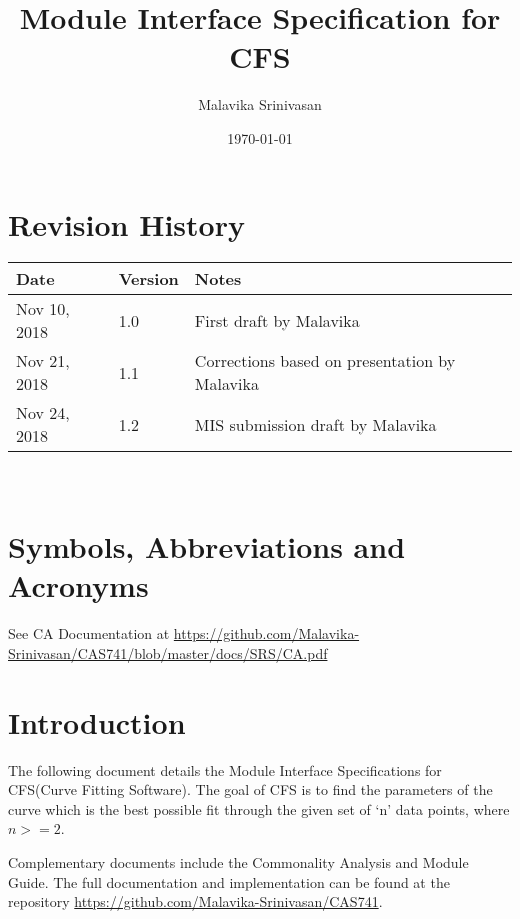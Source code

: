 \documentclass[12pt, titlepage]{article}
\newcommand{\progname}{CFS}
\begin{document}
\title{Module Interface Specification for \progname}

\author{Malavika Srinivasan}

\date{\today}

\maketitle


\section{Revision History}

\begin{tabularx}{\textwidth}{p{3cm}p{2cm}X}
\toprule {\bf Date} & {\bf Version} & {\bf Notes}\\
\midrule
Nov 10, 2018 & 1.0 & First draft by Malavika\\
Nov 21, 2018 & 1.1 & Corrections based on presentation by Malavika\\
Nov 24, 2018 & 1.2 & MIS submission draft by Malavika\\
\bottomrule
\end{tabularx}

~\newpage

\section{Symbols, Abbreviations and Acronyms}

See CA Documentation at 
\url{https://github.com/Malavika-Srinivasan/CAS741/blob/master/docs/SRS/CA.pdf}


\newpage

\tableofcontents

\newpage


\section{Introduction}

The following document details the Module Interface Specifications for 
\progname(Curve Fitting Software). The goal of \progname{} is to find the 
parameters of the curve which is the best possible fit through the given set of 
`n' data points, where $n >= 2$.

Complementary documents include the Commonality Analysis and Module Guide. The 
full documentation and implementation can be found at the repository 
\url{https://github.com/Malavika-Srinivasan/CAS741}.
\end{document}
